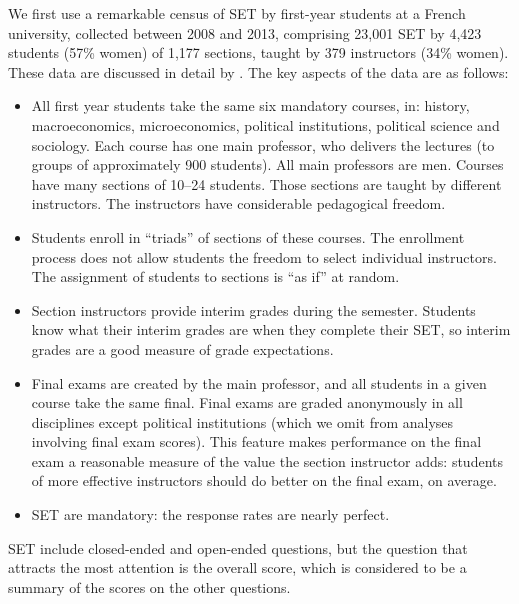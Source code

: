 \documentclass[12pt]{article}
\begin{document}
We first use a remarkable census of SET by first-year students at a French university, collected between 2008 and 2013, 
comprising 23,001 SET by
4,423 students (57\% women) of 1,177
sections, taught by 379 instructors (34\% women). These data are discussed in detail by \citet{Boring2015}.
The key aspects of the data are as follows:
\begin{itemize}
   \item All first year students take the same six mandatory courses, in: history, macroeconomics, microeconomics, 
            political institutions, political science and sociology.
            Each course has one main professor,
            who delivers the lectures (to groups of approximately 900 students). All main professors are men.
            Courses have many sections of 10--24 students. 
            Those sections are taught by different instructors.
            The instructors have considerable pedagogical freedom.
    
   \item Students enroll in ``triads'' of sections of these courses. 
            The enrollment process
            does not allow students the freedom to select individual instructors.
            The assignment of students to sections is ``as if'' at random.
            
   \item Section instructors provide interim grades during the semester. 
            Students know what their interim grades are when they complete their SET, so interim grades are a 
            good measure of grade expectations.
            
   \item Final exams are created by the main professor, and all students in a given course take the
            same final. Final exams are graded anonymously in all disciplines except political
            institutions (which we omit from analyses involving final exam scores).
            This feature makes performance on the final exam a reasonable measure of the value the
            section instructor adds: students of more effective instructors should do better on
            the final exam, on average.
    
   \item SET are mandatory: the response rates are nearly perfect.
   
\end{itemize}

SET include closed-ended and open-ended questions, 
but the question that attracts the most attention is the overall
score, which is considered to be a summary 
of the scores on the other questions. 
\end{document}
